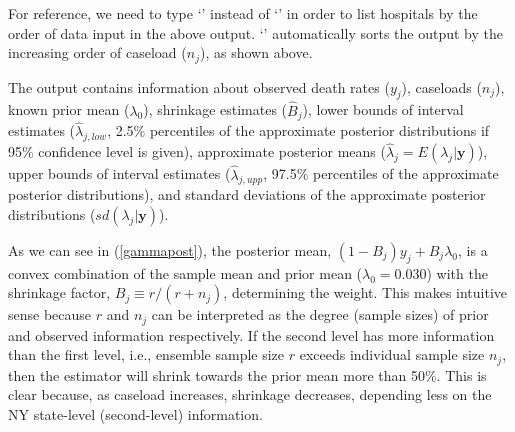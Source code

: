 \documentclass[article]{jss}
\begin{document}
For reference, we need to type `' instead of `' in order to list hospitals by the order of data input in the above output. `' automatically sorts the output by the increasing order of caseload ($n_{j}$), as shown above.


The output contains information about observed death rates ($y_{j}$), caseloads ($n_{j}$), known prior mean ($\lambda_{0}$), shrinkage estimates ($\hat{B}_{j}$), lower bounds of interval estimates ($\hat{\lambda}_{j, low}$, 2.5\% percentiles of the approximate posterior distributions if 95\% confidence level is given), approximate posterior means ($\hat{\lambda}_{j}=E(\lambda_{j}\vert \boldsymbol{y})$), upper bounds  of interval estimates ($\hat{\lambda}_{j, upp}$, 97.5\% percentiles of the approximate posterior distributions), and standard deviations of the approximate posterior distributions ($sd(\lambda_{j}\vert \boldsymbol{y})$).


As we can see in (\ref{gammapost}), the posterior mean, $(1-B_{j})y_{j} + B_{j}\lambda_{0}$, is a convex combination of the sample mean and prior mean ($\lambda_{0}=0.030$) with the shrinkage factor, $B_{j}\equiv r / (r + n_{j})$, determining the weight. This makes intuitive sense because $r$ and $n_{j}$ can be interpreted as the degree (sample sizes) of prior and observed information respectively. If the second level has more information than the first level, i.e., ensemble sample size $r$ exceeds individual sample size $n_{j}$, then the estimator will shrink towards the prior mean more than 50\%. This is clear because, as caseload increases, shrinkage decreases, depending less on the NY state-level (second-level) information.
\end{document}
